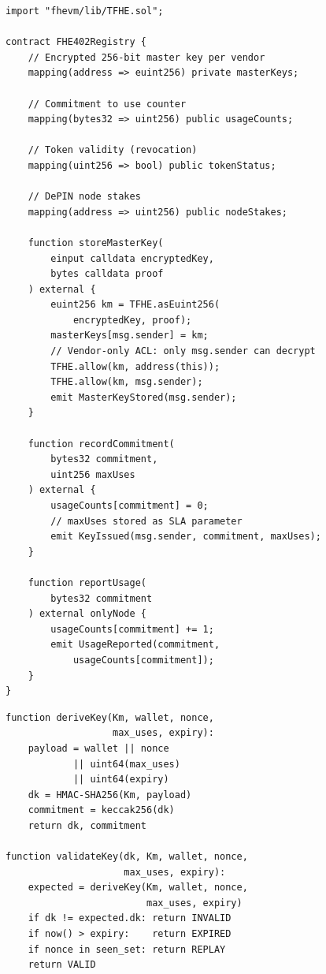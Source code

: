 \documentclass[conference]{IEEEtran}
\begin{document}
\begin{lstlisting}[language={}, caption={Master Key Storage with FHE ACL}]
import "fhevm/lib/TFHE.sol";

contract FHE402Registry {
    // Encrypted 256-bit master key per vendor
    mapping(address => euint256) private masterKeys;

    // Commitment to use counter
    mapping(bytes32 => uint256) public usageCounts;

    // Token validity (revocation)
    mapping(uint256 => bool) public tokenStatus;

    // DePIN node stakes
    mapping(address => uint256) public nodeStakes;

    function storeMasterKey(
        einput calldata encryptedKey,
        bytes calldata proof
    ) external {
        euint256 km = TFHE.asEuint256(
            encryptedKey, proof);
        masterKeys[msg.sender] = km;
        // Vendor-only ACL: only msg.sender can decrypt
        TFHE.allow(km, address(this));
        TFHE.allow(km, msg.sender);
        emit MasterKeyStored(msg.sender);
    }

    function recordCommitment(
        bytes32 commitment,
        uint256 maxUses
    ) external {
        usageCounts[commitment] = 0;
        // maxUses stored as SLA parameter
        emit KeyIssued(msg.sender, commitment, maxUses);
    }

    function reportUsage(
        bytes32 commitment
    ) external onlyNode {
        usageCounts[commitment] += 1;
        emit UsageReported(commitment,
            usageCounts[commitment]);
    }
}
\end{lstlisting}

\begin{lstlisting}[language={}, caption={HMAC Key Derivation (Pseudocode)}]
function deriveKey(Km, wallet, nonce,
                   max_uses, expiry):
    payload = wallet || nonce
            || uint64(max_uses)
            || uint64(expiry)
    dk = HMAC-SHA256(Km, payload)
    commitment = keccak256(dk)
    return dk, commitment

function validateKey(dk, Km, wallet, nonce,
                     max_uses, expiry):
    expected = deriveKey(Km, wallet, nonce,
                         max_uses, expiry)
    if dk != expected.dk: return INVALID
    if now() > expiry:    return EXPIRED
    if nonce in seen_set: return REPLAY
    return VALID
\end{lstlisting}

\end{document}
